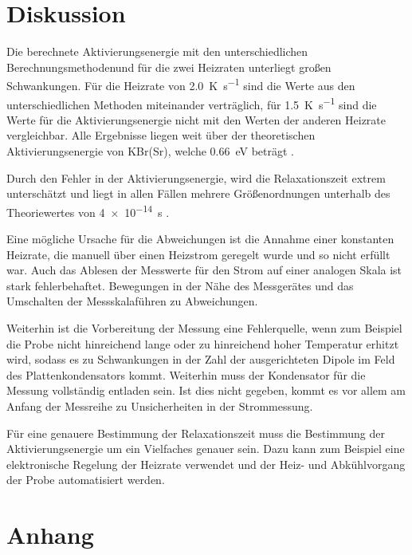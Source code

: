 \section{Diskussion}

Die berechnete Aktivierungsenergie mit den unterschiedlichen Berechnungsmethodenund für die zwei Heizraten unterliegt großen Schwankungen. Für die Heizrate von \SI{2.0}{\kelvin\per\second} sind die Werte aus den unterschiedlichen Methoden miteinander verträglich, für \SI{1.5}{\kelvin\per\second} sind die Werte für die Aktivierungsenergie nicht mit den Werten der anderen Heizrate vergleichbar. Alle Ergebnisse liegen weit über der theoretischen Aktivierungsenergie von KBr(Sr), welche \SI{0.66}{\electronvolt} beträgt \cite{KBr-Sr}.\par
Durch den Fehler in der Aktivierungsenergie, wird die Relaxationszeit extrem unterschätzt und liegt in allen Fällen mehrere Größenordnungen unterhalb des Theoriewertes von \SI{4e-14}{\second} \cite{KBr-Sr}.\par
Eine mögliche Ursache für die Abweichungen ist die Annahme einer konstanten Heizrate, die manuell über einen Heizstrom geregelt wurde und so nicht erfüllt war. Auch das Ablesen der Messwerte für den Strom auf einer analogen Skala ist stark fehlerbehaftet. Bewegungen in der Nähe des Messgerätes und das Umschalten der Messskalaführen zu Abweichungen.\par
Weiterhin ist die Vorbereitung der Messung eine Fehlerquelle, wenn zum Beispiel die Probe nicht hinreichend lange oder zu hinreichend hoher Temperatur erhitzt wird, sodass es zu Schwankungen in der Zahl der ausgerichteten Dipole im Feld des Plattenkondensators kommt. Weiterhin muss der Kondensator für die Messung vollständig entladen sein. Ist dies nicht gegeben, kommt es vor allem am Anfang der Messreihe zu Unsicherheiten in der Strommessung.\par
Für eine genauere Bestimmung der Relaxationszeit muss die Bestimmung der Aktivierungsenergie um ein Vielfaches genauer sein. Dazu kann zum Beispiel eine elektronische Regelung der Heizrate verwendet und der Heiz- und Abkühlvorgang der Probe automatisiert werden.

\printbibliography
\newpage

\section{Anhang}



